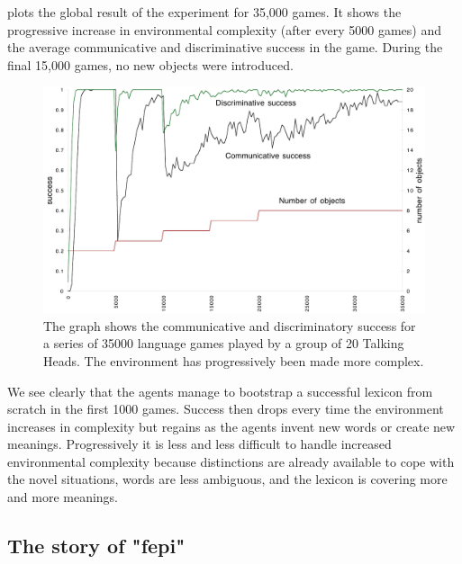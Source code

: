  plots the global 
result of the experiment for 35,000 games. It shows the progressive 
increase in environmental complexity (after every 
5000 games) and the average communicative and discriminative
success in the game. During the final 15,000 games, no new
objects were introduced. 
\begin{figure}[htbp]
  \centerline{\includegraphics[width=.80\textwidth]{chap7/figs/globalsuccess}}
\caption{ \label{globalsuccess} The graph shows the communicative
and discriminatory success for a series of 35000 language games
played by a group of 20 Talking Heads. The environment 
has progressively been made more complex.}
\end{figure}

We see clearly that the agents manage to bootstrap 
a successful lexicon from scratch in the first 1000 
games. Success then drops every time
the environment increases in complexity but regains as the 
agents invent new words or create new meanings. Progressively 
it is less and less difficult to handle increased
environmental complexity because distinctions are 
already available to cope with the novel
situations, words are less ambiguous, 
and the lexicon is covering more and more meanings. 

\subsection{The story of "fepi"}

